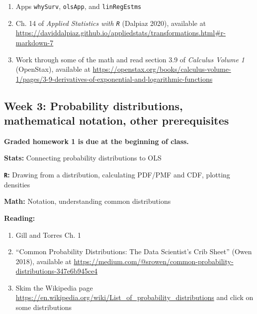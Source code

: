 \documentclass[12pt]{article}
\begin{document}
\begin{enumerate}[1)]

\item Apps \texttt{whySurv}, \texttt{olsApp}, and \texttt{linRegEstms}

\item Ch. 14 of \emph{Applied Statistics with \texttt{R}} (Dalpiaz 2020), available at \href{https://daviddalpiaz.github.io/appliedstats/transformations.html#r-markdown-7}{https://daviddalpiaz.github.io/appliedstats/transformations.html\#r-markdown-7}

\item Work through some of the math and read section 3.9 of \emph{Calculus Volume 1} (OpenStax), available at \href{https://openstax.org/books/calculus-volume-1/pages/3-9-derivatives-of-exponential-and-logarithmic-functions}{https://openstax.org/books/calculus-volume-1/pages/3-9-derivatives-of-exponential-and-logarithmic-functions}

\end{enumerate}

\subsection*{Week 3: Probability distributions, mathematical notation, other prerequisites}

\noindent \textbf{Graded homework 1 is due at the beginning of class.}

\noindent \textbf{Stats:} Connecting probability distributions to OLS

\noindent \textbf{\texttt{R}:} Drawing from a distribution, calculating PDF/PMF and CDF, plotting densities

\noindent \textbf{Math:} Notation, understanding common distributions

\noindent \textbf{Reading:}

\begin{enumerate}[1)]

\item Gill and Torres Ch. 1

\item ``Common Probability Distributions: The Data Scientist's Crib Sheet'' (Owen 2018), available at \href{https://medium.com/@srowen/common-probability-distributions-347e6b945ce4}{https://medium.com/@srowen/common-probability-distributions-347e6b945ce4}

\item Skim the Wikipedia page \href{https://en.wikipedia.org/wiki/List_of_probability_distributions}{https://en.wikipedia.org/wiki/List\_of\_probability\_distributions} and click on some distributions

\end{enumerate}
\end{document}
